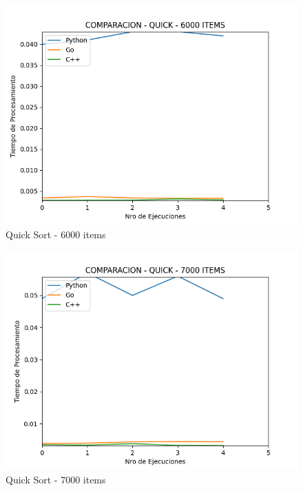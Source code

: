 \documentclass[12pt]{article} %
\begin{document}
    \begin{figure}[H]
    \centering
    \includegraphics[width=\textwidth]{quick_6000}
    \caption{Quick Sort - 6000 items}
    \end{figure}

    \vspace{5mm}
    
    \begin{figure}[H]
    \centering
    \includegraphics[width=\textwidth]{quick_7000}
    \caption{Quick Sort - 7000 items}
    \end{figure}

    \vspace{5mm}
    
\end{document}
